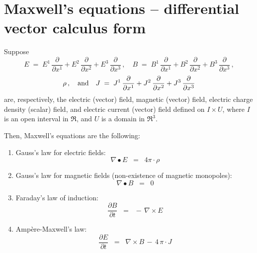 

\section{Maxwell's equations -- differential vector calculus form}
\setcounter{theorem}{0}
\setcounter{equation}{0}


\renewcommand{\theenumi}{\roman{enumi}}
\renewcommand{\labelenumi}{\textnormal{(\theenumi)}$\;\;$}


Suppose
\begin{equation*}
E \; = \; E^{1}\,\dfrac{\partial}{\partial x^{1}} + E^{2}\,\dfrac{\partial}{\partial x^{2}} + E^{3}\,\dfrac{\partial}{\partial x^{3}}\,,
\quad
B \; = \; B^{1}\,\dfrac{\partial}{\partial x^{1}} + B^{2}\,\dfrac{\partial}{\partial x^{2}} + B^{3}\,\dfrac{\partial}{\partial x^{3}}\,,
\end{equation*}
\begin{equation*}
\rho\,,
\quad\textnormal{and}\quad
J \; = \; J^{1}\,\dfrac{\partial}{\partial x^{1}} + J^{2}\,\dfrac{\partial}{\partial x^{2}} + J^{3}\,\dfrac{\partial}{\partial x^{3}}
\end{equation*}
are, respectively, the electric (vector) field, magnetic (vector) field,
electric charge density (scalar) field, and electric current (vector) field
defined on $I \times U$,
where $I$ is an open interval in $\Re$, and $U$ is a domain in $\Re^{3}$.

\vskip 0.5cm
\noindent
Then, Maxwell's equations are the following:
\begin{enumerate}
\item
	Gauss's law for electric fields:
	\begin{equation*}
	\nabla \bullet E \;\; = \;\; 4 \pi \cdot \rho
	\end{equation*}

\item
	Gauss's law for magnetic fields (non-existence of magnetic monopoles):
	\begin{equation*}
	\nabla \bullet B \;\; = \;\; 0
	\end{equation*}

\item
	Faraday's law of induction:
	\begin{equation*}
	\dfrac{\partial B}{\partial t} \;\; = \;\; -\,\nabla \times E
	\end{equation*}

\item
	Amp\`{e}re-Maxwell's law:
	\begin{equation*}
	\dfrac{\partial E}{\partial t} \;\; = \;\; \nabla \times B \,-\, 4\,\pi\cdot J
	\end{equation*}
\end{enumerate}

